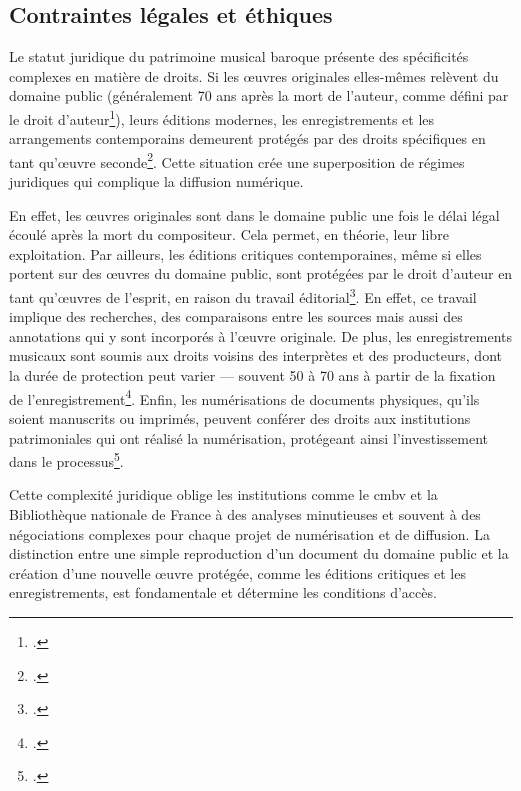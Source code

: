 \subsection{Contraintes légales et éthiques}

Le statut juridique du patrimoine musical baroque présente des spécificités complexes en matière de droits. Si les œuvres originales elles-mêmes relèvent du domaine public (généralement 70 ans après la mort de l'auteur, comme défini par le droit d'auteur\footcite{ChapitreIIIDuree}), leurs éditions modernes, les enregistrements et les arrangements contemporains demeurent protégés par des droits spécifiques en tant qu'œuvre seconde\footcite{barbryDroitsAuteurDroits1997}. Cette situation crée une superposition de régimes juridiques qui complique la diffusion numérique.

En effet, les œuvres originales sont dans le domaine public une fois le délai légal écoulé après la mort du compositeur. Cela permet, en théorie, leur libre exploitation. Par ailleurs, les éditions critiques contemporaines, même si elles portent sur des œuvres du domaine public, sont protégées par le droit d'auteur en tant qu'œuvres de l'esprit, en raison du travail éditorial\footcite{ChapitreIIOeuvres}. En effet, ce travail implique des recherches, des comparaisons entre les sources mais aussi des annotations qui y sont incorporés à l'œuvre originale. De plus, les enregistrements musicaux sont soumis aux droits voisins des interprètes et des producteurs, dont la durée de protection peut varier --- souvent 50 à 70 ans à partir de la fixation de l'enregistrement\footcite{martinoArtistesProducteursStreaming2019}. Enfin, les numérisations de documents physiques, qu'ils soient manuscrits ou imprimés, peuvent conférer des droits aux institutions patrimoniales qui ont réalisé la numérisation, protégeant ainsi l'investissement dans le processus\footcite{talbiInventionConceptPatrimoine2015}.

Cette complexité juridique oblige les institutions comme le \gls{cmbv} et la Bibliothèque nationale de France à des analyses minutieuses et souvent à des négociations complexes pour chaque projet de numérisation et de diffusion. La distinction entre une simple reproduction d'un document du domaine public et la création d'une nouvelle œuvre protégée, comme les éditions critiques et les enregistrements, est fondamentale et détermine les conditions d'accès.

